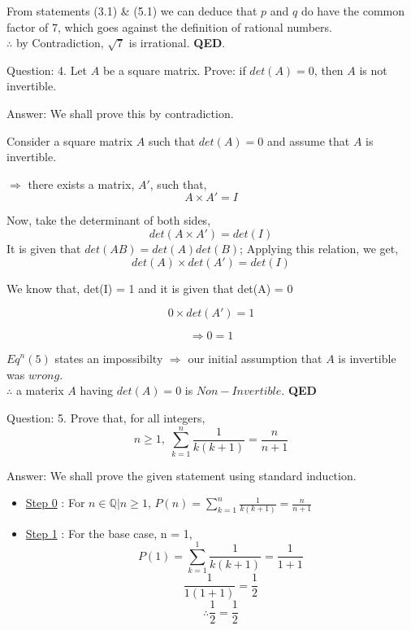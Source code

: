 \documentclass[a4paper]{article}
\begin{document}
\begin{qalist}
		From statements (3.1) \& (5.1) we can deduce that $p$ and $q$ do have the common factor of 7, which goes against the definition of rational numbers. \\
		$\therefore$ by Contradiction, $\sqrt{7}$ is irrational. \textbf{QED}.
		
		\item[Question: 4. ] \setcounter{equation}{0} Let $A$ be a square matrix. Prove: if $det(A) = 0$, then $A$ is not invertible. 
		\item[Answer:]  We shall prove this by contradiction.
		
		Consider a square matrix $A$ such that $det(A) = 0$ and assume that $A$ is invertible.
		
		$\Rightarrow$ there exists a matrix, $A'$, such that, \begin{equation}A \times A' = I\end{equation}
		
		Now, take the determinant of both sides,
		\begin{equation}
			det(A \times A') = det(I)
		\end{equation}
		It is given that $det(AB) = det(A)det(B)$; Applying this relation, we get, 
		\begin{equation}
			det(A) \times det(A') = det(I)
		\end{equation}
		
		We know that, det(I) = 1 and it is given that det(A) = 0
		
		\begin{equation}
			0 \times det(A') = 1
		\end{equation}
		
		\begin{equation}
			\Rightarrow 0 = 1
		\end{equation}
		
		${Eq}^{n} (5)$ states an impossibilty $\Rightarrow$ our initial assumption that $A$ is invertible was $wrong$.\\
		$\therefore$ a materix $A$ having $det(A) = 0$ is $Non-Invertible$. \textbf{QED}
		
		\item[Question: 5. ] \setcounter{equation}{0} Prove that, for all integers, \[n \geq 1, \; \sum_{k=1}^{n} \frac{1}{k(k+1)} = \frac{n}{n+1}\]
		\item[Answer:]  We shall prove the given statement using standard induction.
			
			\begin{itemize}
				\item \underline{Step 0} : For $n \in \mathbb{Q} | n \geq 1$, $P(n) = \sum_{k=1}^{n} \frac{1}{k(k+1)} = \frac{n}{n+1}$ 
				\item \underline{Step 1} : For the base case, n = 1, 
					\[ P(1) = \sum_{k=1}^{1} \frac{1}{k(k+1)} = \frac{1}{1+1}\]
					\[\frac{1}{1(1+1)} = \frac{1}{2}\]
					\[\therefore \frac{1}{2} = \frac{1}{2}\]
					

\end{itemize}
\end{qalist}
\end{document}
